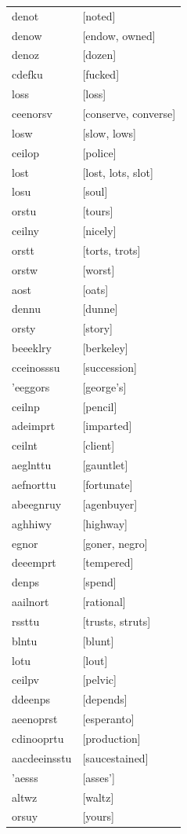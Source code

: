 \documentclass{article}
\begin{document}
\begin{tabular}{ll}
denot & [noted] \\
denow & [endow, owned] \\
denoz & [dozen] \\
cdefku & [fucked] \\
loss & [loss] \\
ceenorsv & [conserve, converse] \\
losw & [slow, lows] \\
ceilop & [police] \\
lost & [lost, lots, slot] \\
losu & [soul] \\
orstu & [tours] \\
ceilny & [nicely] \\
orstt & [torts, trots] \\
orstw & [worst] \\
aost & [oats] \\
dennu & [dunne] \\
orsty & [story] \\
beeeklry & [berkeley] \\
cceinosssu & [succession] \\
'eeggors & [george's] \\
ceilnp & [pencil] \\
adeimprt & [imparted] \\
ceilnt & [client] \\
aeglnttu & [gauntlet] \\
aefnorttu & [fortunate] \\
abeegnruy & [agenbuyer] \\
aghhiwy & [highway] \\
egnor & [goner, negro] \\
deeemprt & [tempered] \\
denps & [spend] \\
aailnort & [rational] \\
rssttu & [trusts, struts] \\
blntu & [blunt] \\
lotu & [lout] \\
ceilpv & [pelvic] \\
ddeenps & [depends] \\
aeenoprst & [esperanto] \\
cdinooprtu & [production] \\
aacdeeinsstu & [saucestained] \\
'aesss & [asses'] \\
altwz & [waltz] \\
orsuy & [yours] \\

\end{tabular}
\end{document}
